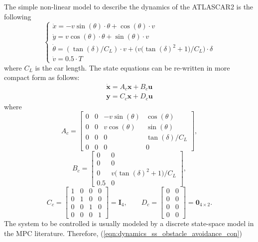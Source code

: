 \documentclass[conference, 11pt]{IEEEtran}
\begin{document}
The simple non-linear model to describe the dynamics of the ATLASCAR2 is the following
\begin{equation*}
	\label{eqn:dynamics_model_obstacle_avoidance}
	\left \{ \begin{array}{llll}
	\dot{x} = -v\sin(\theta)\cdot\theta+\cos(\theta)\cdot v\\
	\dot{y} = v\cos(\theta)\cdot\theta+\sin(\theta)\cdot v\\
	\dot{\theta} =(\tan(\delta)/C_L)\cdot v+ \bigg(v\bigg(\tan(\delta)^2+1\bigg)/C_L\bigg)\cdot \delta\\
	\dot{v} =0.5\cdot T
	\end{array} 
	\right .
\end{equation*}
where $C_L$ is the car length. The state equations can be re-written in more compact form as follows:
\begin{equation}
	\label{eqn:dynamics_ss_obstacle_avoidance_con}
	\begin{array}{ll}
	\dot{\textbf{x}} =A_c \textbf{x}+ B_c \textbf{u}\\
	\textbf{y} =C_c \textbf{x} + D_c \textbf{u}
	\end{array}
\end{equation}
where
\[ 
A_c=\begin{bmatrix}
0&0&-v\sin(\theta)&\cos(\theta)\\
0&0&v\cos(\theta)&\sin(\theta)\\
0&0&0&\tan(\delta)/C_L\\
0&0&0&0
\end{bmatrix},
\]
\[
B_c=\begin{bmatrix}
0&0\\
0&0\\
0&v\bigg(\tan(\delta)^2+1\bigg)/C_L\\
0.5&0
\end{bmatrix},
\]
\[
C_c=\begin{bmatrix}
1&0&0&0\\
0&1&0&0\\
0&0&1&0\\
0&0&0&1
\end{bmatrix} = \textbf{I}_4, 
\qquad
D_c=\begin{bmatrix}
0&0\\
0&0\\
0&0\\
0&0
\end{bmatrix} = \textbf{0}_{4\times2}. 
\]
The system to be controlled is usually modeled by a discrete state-space model in the MPC literature. Therefore, (\ref{eqn:dynamics_ss_obstacle_avoidance_con})
\end{document}
